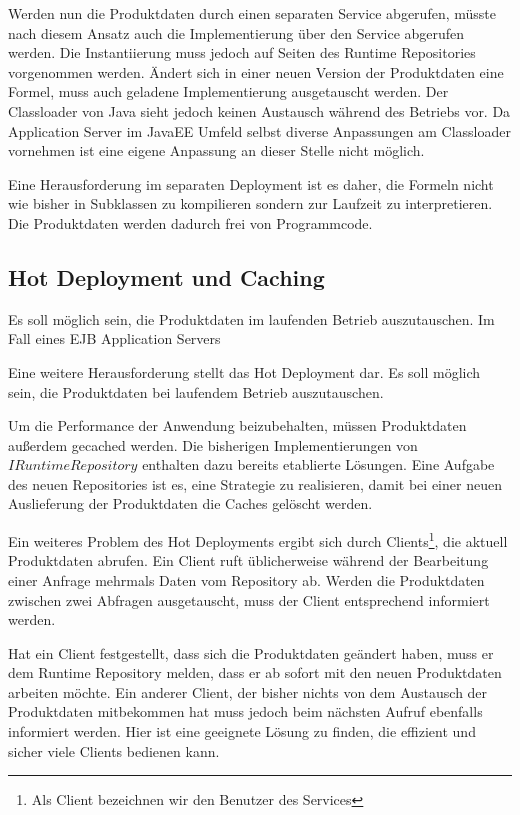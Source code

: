 \documentclass[headsepline=true, footsepline=true]{scrartcl}
\begin{document}
Werden nun die Produktdaten durch einen separaten Service abgerufen, müsste nach
diesem Ansatz auch die Implementierung über den Service abgerufen werden. Die
Instantiierung muss jedoch auf Seiten des Runtime Repositories vorgenommen
werden. Ändert sich in einer neuen Version der Produktdaten eine Formel, muss
auch geladene Implementierung ausgetauscht werden. Der Classloader von Java
sieht jedoch keinen Austausch während des Betriebs vor. Da Application Server im
JavaEE Umfeld selbst diverse Anpassungen am Classloader vornehmen ist eine
eigene Anpassung an dieser Stelle nicht möglich.

Eine Herausforderung im separaten Deployment ist es daher, die Formeln nicht wie
bisher in Subklassen zu kompilieren sondern zur Laufzeit zu interpretieren. Die
Produktdaten werden dadurch frei von Programmcode.

\subsection{Hot Deployment und Caching}
\label{hot_deployment}

Es soll möglich sein, die Produktdaten im laufenden Betrieb auszutauschen. Im
Fall eines EJB Application Servers


Eine weitere Herausforderung stellt das Hot Deployment dar. Es soll möglich
sein, die Produktdaten bei laufendem Betrieb auszutauschen.

Um die Performance der Anwendung beizubehalten, müssen Produktdaten außerdem
gecached werden. Die bisherigen Implementierungen von $IRuntimeRepository$
enthalten dazu bereits etablierte Lösungen. Eine Aufgabe des neuen Repositories
ist es, eine Strategie zu realisieren, damit bei einer neuen Auslieferung der
Produktdaten die Caches gelöscht werden.

Ein weiteres Problem des Hot Deployments ergibt sich durch
Clients\footnote{Als Client bezeichnen wir den Benutzer des Services}, die aktuell Produktdaten abrufen. Ein Client ruft
üblicherweise während der Bearbeitung einer Anfrage mehrmals Daten vom
Repository ab. Werden die Produktdaten zwischen zwei Abfragen ausgetauscht, 
muss der Client entsprechend informiert werden.

Hat ein Client festgestellt, dass sich die Produktdaten geändert haben, muss er
dem Runtime Repository melden, dass er ab sofort mit den neuen Produktdaten
arbeiten möchte. Ein anderer Client, der bisher nichts von dem Austausch der
Produktdaten mitbekommen hat muss jedoch beim nächsten Aufruf ebenfalls
informiert werden. Hier ist eine geeignete Lösung zu finden, die effizient
und sicher viele Clients bedienen kann.
\end{document}
